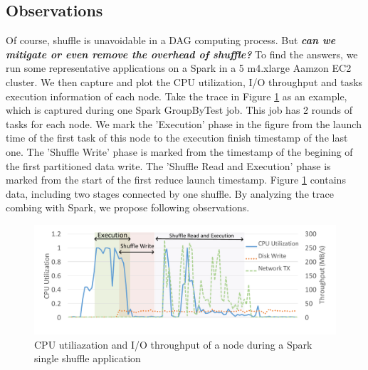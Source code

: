 \subsection{Observations} \label{observation}
Of course, shuffle is unavoidable in a DAG computing process. But \textbf{\textit{can we mitigate or even remove the overhead of shuffle?}} To find the answers, we run some representative applications on a Spark in a 5 m4.xlarge Aamzon EC2 cluster. We then capture and plot the CPU utilization, I/O throughput and tasks execution information of each node. Take the trace in Figure \ref{fig:util} as an example, which is captured during one Spark GroupByTest job. This job has 2 rounds of tasks for each node. We mark the 'Execution' phase in the figure from the launch time of the first task of this node to the execution finish timestamp of the last one. The 'Shuffle Write' phase is marked from the timestamp of the begining of the first partitioned data write. The 'Shuffle Read and Execution' phase is marked from the start of the first reduce launch timestamp.
Figure \ref{fig:util} contains data, including two stages connected by one shuffle. By analyzing the trace combing with Spark, we propose following observations.

\begin{figure}
	\includegraphics[width=\linewidth]{fig/util}
	\caption{CPU utiliazation and I/O throughput of a node during a Spark single shuffle application}
	\label{fig:util}
\end{figure}

